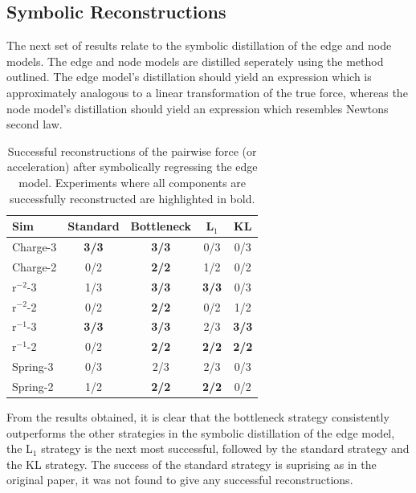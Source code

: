 \documentclass[11pt]{article}
\begin{document}
\subsection{Symbolic Reconstructions}
The next set of results relate to the symbolic distillation of the edge and node models. The edge and node models are distilled seperately using the method outlined. The edge model's distillation should yield an expression which is approximately analogous to a linear transformation of the true force, whereas the node model's distillation should yield an expression which resembles Newtons second law.
\begin{table}[H]
        \centering
        \begin{tabular}{lcccc}
        \hline
        Sim & Standard & Bottleneck & L$_1$ & KL \\
        \hline
        Charge-3 & \textbf{3/3} & \textbf{3/3} & 0/3 & 0/3 \\
        Charge-2 & 0/2 & \textbf{2/2} & 1/2 & 0/2 \\
        r$^{-2}$-3 & 1/3 & \textbf{3/3} & \textbf{3/3} & 0/3 \\
        r$^{-2}$-2 & 0/2 & \textbf{2/2} & 0/2 & 1/2 \\
        r$^{-1}$-3 & \textbf{3/3} & \textbf{3/3} & 2/3 & \textbf{3/3} \\
        r$^{-1}$-2 & 0/2 & \textbf{2/2} & \textbf{2/2} & \textbf{2/2} \\
        Spring-3 & 0/3 & 2/3 & 2/3  & 0/3 \\
        Spring-2 & 1/2 & \textbf{2/2} & \textbf{2/2} & 0/2 \\
        \hline
        \end{tabular}
        \caption{Successful reconstructions of the pairwise force (or acceleration) after symbolically regressing the edge model. Experiments where all components are successfully reconstructed are highlighted in bold.}
        \label{tab:sr_edge_model_table}
    \end{table}
From the results obtained, it is clear that the bottleneck strategy consistently outperforms the other strategies in the symbolic distillation of the edge model, the L$_1$ strategy is the next most successful, followed by the standard strategy and the KL strategy. The success of the standard strategy is suprising as in the original paper, it was not found to give any successful reconstructions.
\end{document}
